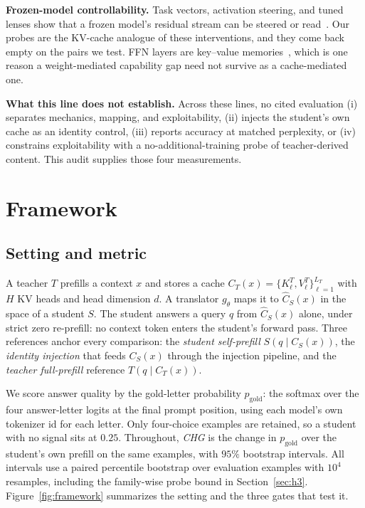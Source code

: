 \documentclass[10pt]{article}
\newcommand{\kv}{\ensuremath{\mathrm{KV}}}
\newcommand{\gold}{\ensuremath{p_{\mathrm{gold}}}}
\begin{document}
\textbf{Frozen-model controllability.} Task vectors, activation steering, and
tuned lenses show that a frozen model's residual stream can be steered or
read~\citep{taskvectors2023,actsteer2024,tunedlens2023,gist2023}. Our probes are
the \kv{}-cache analogue of these interventions, and they come back empty on the
pairs we test. FFN layers are key--value memories~\citep{ffnmemory2021}, which is
one reason a weight-mediated capability gap need not survive as a cache-mediated
one.

\textbf{What this line does not establish.} Across these lines, no cited
evaluation (i) separates mechanics, mapping, and exploitability, (ii) injects
the student's own cache as an identity control, (iii) reports accuracy at
matched perplexity, or (iv) constrains exploitability with a
no-additional-training probe of teacher-derived content. This audit supplies those four measurements.


\section{Framework}
\label{sec:framework}

\subsection{Setting and metric}
A teacher $T$ prefills a context $x$ and stores a cache
$C_T(x)=\{K^T_\ell,V^T_\ell\}_{\ell=1}^{L_T}$ with $H$ \kv{} heads and head
dimension $d$. A translator $g_\theta$ maps it to $\widehat C_S(x)$ in the space
of a student $S$. The student answers a query $q$ from
$\widehat C_S(x)$ alone, under strict zero re-prefill: no context token enters
the student's forward pass. Three references anchor every comparison: the
\emph{student self-prefill} $S(q\mid C_S(x))$, the \emph{identity injection}
that feeds $C_S(x)$ through the injection pipeline, and the \emph{teacher
full-prefill} reference $T(q\mid C_T(x))$.

We score answer quality by the gold-letter probability $\gold$: the softmax over
the four answer-letter logits at the final prompt position, using each model's
own tokenizer id for each letter. Only four-choice examples are retained, so a
student with no signal sits at $0.25$. Throughout, \emph{CHG} is the change in
$\gold$ over the student's own prefill on the same examples, with $95\%$
bootstrap intervals. All intervals use a paired percentile bootstrap over
evaluation examples with $10^4$ resamples, including the family-wise probe
bound in Section~\ref{sec:h3}. Figure~\ref{fig:framework} summarizes the
setting and the three gates that test it.
\end{document}

